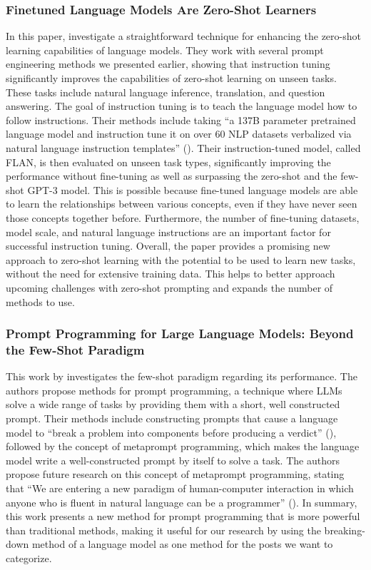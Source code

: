 \documentclass[english,bachelor]{swsLeipzig}
\begin{document}
\subsubsection{Finetuned Language Models Are Zero-Shot Learners}
In this paper, \citet{wei:2021} investigate a straightforward technique for enhancing the zero-shot learning 
capabilities of language models. They work with several prompt engineering methods we presented earlier, showing that instruction tuning significantly improves the capabilities of zero-shot learning on unseen tasks. These tasks include natural language inference, translation, and question answering. The goal of instruction tuning is to teach the language model how to follow instructions. Their methods include taking ``a 137B parameter pretrained language model and instruction tune it on over 60 NLP datasets verbalized via natural language instruction templates'' (\citet{wei:2021}). Their instruction-tuned model, called FLAN, is then evaluated on unseen task types, significantly improving the performance without fine-tuning as well as surpassing the zero-shot and the few-shot GPT-3 model. This is possible because fine-tuned language models are able to learn the relationships between various concepts, even if they have never seen those concepts together before. Furthermore, the number of fine-tuning datasets, model scale, and natural language instructions are an important factor for successful instruction tuning. Overall, the paper provides a promising new approach to zero-shot learning with the potential to be used to learn new tasks, without the need for extensive training data. This helps to better approach upcoming challenges with zero-shot prompting and expands the number of methods to use.

\subsubsection{Prompt Programming for Large Language Models: Beyond the Few-Shot Paradigm}
This work by \citet{reynolds:2021} investigates the few-shot paradigm regarding its performance. The authors 
propose methods for prompt programming, a technique where LLMs solve a wide range of tasks by providing them with a short, well constructed prompt. Their methods include constructing prompts that cause a language model to ``break a problem into components before producing a verdict'' (\citet{reynolds:2021}), followed by the concept of metaprompt programming, which makes the language model write a well-constructed prompt by itself to solve a task. The authors propose future research on this concept of metaprompt programming, stating that ``We are entering a new paradigm of human-computer interaction in which anyone who is fluent in natural language can be a programmer'' (\citet{reynolds:2021}). In summary, this work presents a new method for prompt programming that is more powerful than traditional methods, making it useful for our research by using the breaking-down method of a language model as one method for the posts we want to categorize.
\end{document}

